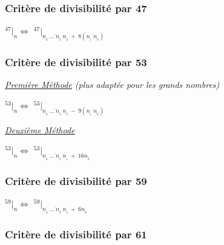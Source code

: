 \documentclass[a4paper]{article}
\begin{document}
\vfill
{\noindent \dotfill}


\subsubsection*{Critère de divisibilité par 47}

\begin{center}
	\huge
	$ ^{47}|_n \Leftrightarrow$ $^{47}|_{\overline{n_{_{k}}~\dots~n_{_3}~n_{_2}}~+~8\left(\overline{n_{_1}~n_{_0}}\right)} $
\end{center}

\pagebreak






\subsubsection*{Critère de divisibilité par 53}

{\noindent  \textit{\underline{Première Méthode} (plus adaptée pour les grands nombres)}}	

\begin{center}
	\huge
	$ ^{53}|_n \Leftrightarrow$ $^{53}|_{\overline{n_{_{k}}~\dots~n_{_3}~n_{_2}}~-~9\left(\overline{n_{_1}~n_{_0}}\right)} $
	
\end{center}


{\noindent  \textit{\underline{Deuxième Méthode}}}

\begin{center}
	\huge
	$ ^{53}|_n \Leftrightarrow$ $^{53}|_{\overline{n_{_{k}}~\dots~n_{_2}~n_{_1}}~+~16n_{_0}} $
\end{center}

\vfill
{\noindent \dotfill}

\subsubsection*{Critère de divisibilité par 59}

\begin{center}
	\huge
	$ ^{59}|_n \Leftrightarrow$ $^{59}|_{\overline{n_{_{k}}~\dots~n_{_2}~n_{_1}}~+~6n_{_0}} $
\end{center}

\vfill
{\noindent \dotfill}

\subsubsection*{Critère de divisibilité par 61}
\end{document}
